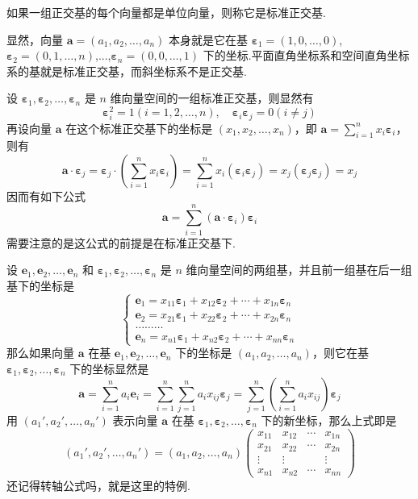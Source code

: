 \begin{definition}
  如果一组正交基的每个向量都是单位向量，则称它是标准正交基.
\end{definition}

显然，向量 $\bm{a}= (a_1, a_2, \ldots, a_n)$ 本身就是它在基
$\bm{\varepsilon}_1 = (1, 0, \ldots, 0)$, $\bm{\varepsilon}_2 =
(0, 1, \ldots, n)$,...,$\bm{\varepsilon}_n = (0, 0, \ldots, 1)$
下的坐标.平面直角坐标系和空间直角坐标系的基就是标准正交基，而斜坐标系不是正交基.

设 $\bm{\varepsilon}_1, \bm{\varepsilon}_2, \ldots,
\bm{\varepsilon}_n$ 是 $n$
维向量空间的一组标准正交基，则显然有
\[ \bm{\varepsilon}_i^2 = 1 (i = 1, 2, \ldots, n), \hspace{1em}
   \bm{\varepsilon}_i \bm{\varepsilon}_j = 0 (i \neq j) \]
再设向量 $\bm{a}$ 在这个标准正交基下的坐标是 $(x_1,
x_2, \ldots, x_n)$，即 $\bm{a}= \sum_{i = 1}^n x_i
\bm{\varepsilon}_i$，则有
\[ \bm{a} \cdot \bm{\varepsilon}_j =\bm{\varepsilon}_j \cdot
   \left( \sum_{i = 1}^n x_i \bm{\varepsilon}_i \right) = \sum_{i = 1}^n
   x_i (\bm{\varepsilon}_i \bm{\varepsilon}_j) = x_j
   (\bm{\varepsilon}_j \bm{\varepsilon}_j) = x_j \]
因而有如下公式
\[ \bm{a}= \sum_{i = 1}^n (\bm{a} \cdot \bm{\varepsilon}_i)
   \bm{\varepsilon}_i \]
需要注意的是这公式的前提是在标准正交基下.


设 $\bm{e}_1, \bm{e}_2, \ldots, \bm{e}_n$ 和
$\bm{\varepsilon}_1, \bm{\varepsilon}_2, \ldots,
\bm{\varepsilon}_n$ 是 $n$
维向量空间的两组基，并且前一组基在后一组基下的坐标是
\[ \left\{ \begin{array}{l}
     \bm{e}_1 = x_{11} \bm{\varepsilon}_1 + x_{12}
     \bm{\varepsilon}_2 + \cdots + x_{1 n} \bm{\varepsilon}_n\\
     \bm{e}_2 = x_{21} \bm{\varepsilon}_1 + x_{22}
     \bm{\varepsilon}_2 + \cdots + x_{2 n} \bm{\varepsilon}_n\\
     \ldots \ldots \ldots\\
     \bm{e}_n = x_{n 1} \bm{\varepsilon}_1 + x_{n 2}
     \bm{\varepsilon}_2 + \cdots + x_{n n} \bm{\varepsilon}_n
   \end{array} \right. \]
那么如果向量 $\bm{a}$ 在基 $\bm{e}_1, \bm{e}_2,
\ldots, \bm{e}_n$ 下的坐标是 $(a_1, a_2, \ldots,
a_n)$，则它在基 $\bm{\varepsilon}_1, \bm{\varepsilon}_2,
\ldots, \bm{\varepsilon}_n$ 下的坐标显然是
\[ \bm{a}= \sum_{i = 1}^n a_i \bm{e}_i = \sum_{i = 1}^n \sum_{j =
   1}^n a_i x_{i j} \bm{\varepsilon}_j = \sum_{j = 1}^n \left( \sum_{i =
   1}^n a_i x_{i j} \right) \bm{\varepsilon}_j \]
用 $(a_1', a_2', \ldots, a_n')$ 表示向量 $\bm{a}$ 在基
$\bm{\varepsilon}_1, \bm{\varepsilon}_2, \ldots,
\bm{\varepsilon}_n$ 下的新坐标，那么上式即是
\[ (a_1', a_2', \ldots, a_n') = (a_1, a_2, \ldots, a_n)
   \left(\begin{array}{cccc}
     x_{11} & x_{12} & \cdots & x_{1 n}\\
     x_{21} & x_{22} & \cdots & x_{2 n}\\
     \vdots & \vdots &  & \vdots\\
     x_{n 1} & x_{n 2} & \cdots & x_{n n}
   \end{array}\right) \]
还记得转轴公式吗，就是这里的特例.

